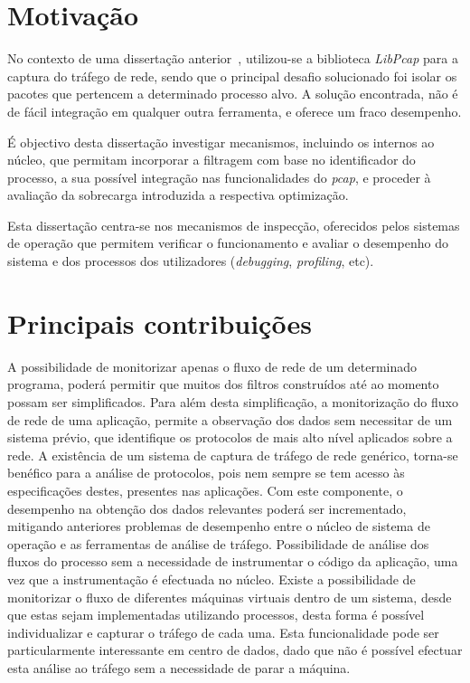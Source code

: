 \section{Motivação}
\label{sub:intro_motivation}

No contexto de uma dissertação anterior~\cite{Farruca:2009}, utilizou-se a biblioteca \textit{LibPcap} para a captura do tráfego de rede, sendo que o principal desafio solucionado foi isolar os pacotes que pertencem a determinado processo alvo.
A solução encontrada, não é de fácil integração em qualquer outra ferramenta, e oferece um fraco desempenho.

É objectivo desta dissertação investigar mecanismos, incluindo os internos ao núcleo, que permitam incorporar a filtragem com base no identificador do processo, a sua possível integração nas funcionalidades do \textit{pcap}, e proceder à avaliação da sobrecarga introduzida a respectiva optimização.

Esta dissertação centra-se nos mecanismos de inspecção, oferecidos pelos sistemas de operação que permitem verificar o funcionamento e avaliar o desempenho do sistema e dos processos dos utilizadores (\textit{debugging}, \textit{profiling}, etc).



\section{Principais contribuições} 
\label{sec:intro_contribuicoes}

A possibilidade de monitorizar apenas o fluxo de rede de um determinado programa, poderá permitir que muitos dos filtros construídos até ao momento possam ser simplificados.
Para além desta simplificação, a monitorização do fluxo de rede de uma aplicação, permite a observação dos dados sem necessitar de um sistema prévio, que identifique os protocolos de mais alto nível aplicados sobre a rede.
A existência de um sistema de captura de tráfego de rede genérico, torna-se benéfico para a análise de protocolos, pois nem sempre se tem acesso às especificações destes, presentes nas aplicações.
Com este componente, o desempenho na obtenção dos dados relevantes poderá ser incrementado, mitigando anteriores problemas de desempenho entre o núcleo de sistema de operação e as ferramentas de análise de tráfego.
Possibilidade de análise dos fluxos do processo sem a necessidade de instrumentar o código da aplicação, uma vez que a instrumentação é efectuada no núcleo.
Existe a possibilidade de monitorizar o fluxo de diferentes máquinas virtuais dentro de um sistema, desde que estas sejam implementadas utilizando processos, desta forma é possível individualizar e capturar o tráfego de cada uma.
Esta funcionalidade pode ser particularmente interessante em centro de dados, dado que não é possível efectuar esta análise ao tráfego sem a necessidade de parar a máquina.

